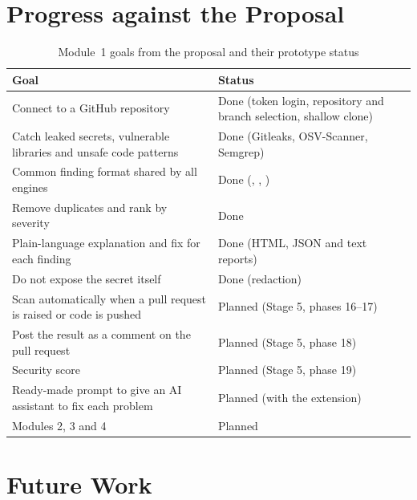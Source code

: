 \documentclass[12pt,a4paper]{article}
\newcommand{\code}[1]{\texttt{\detokenize{#1}}}
\begin{document}
\section{Progress against the Proposal}

\begin{table}[H]
\centering
\caption{Module~1 goals from the proposal and their prototype status}
\label{tab:progress}
\begin{tabularx}{\textwidth}{@{}Xl@{}}
\toprule
\textbf{Goal} & \textbf{Status} \\
\midrule
Connect to a GitHub repository & Done (token login, repository and branch selection, shallow clone) \\
Catch leaked secrets, vulnerable libraries and unsafe code patterns & Done (Gitleaks, OSV-Scanner, Semgrep) \\
Common finding format shared by all engines & Done (\code{Finding}, \code{Severity}, \code{SecurityEngine}) \\
Remove duplicates and rank by severity & Done \\
Plain-language explanation and fix for each finding & Done (HTML, JSON and text reports) \\
Do not expose the secret itself & Done (redaction) \\
Scan automatically when a pull request is raised or code is pushed & Planned (Stage 5, phases 16--17) \\
Post the result as a comment on the pull request & Planned (Stage 5, phase 18) \\
Security score & Planned (Stage 5, phase 19) \\
Ready-made prompt to give an AI assistant to fix each problem & Planned (with the extension) \\
Modules 2, 3 and 4 & Planned \\
\bottomrule
\end{tabularx}
\end{table}

\section{Future Work}
\label{sec:future}
\end{document}
